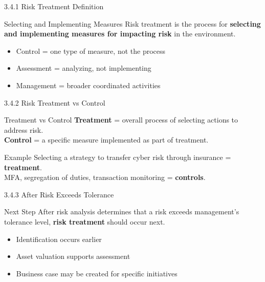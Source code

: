 \documentclass{beamer}
\begin{document}
	\begin{frame}{3.4.1 Risk Treatment Definition}
		\begin{block}{Selecting and Implementing Measures}
			Risk treatment is the process for \textbf{selecting and implementing measures for impacting risk} in the environment.
		\end{block}
		\begin{itemize}
			\item Control = one type of measure, not the process
			\item Assessment = analyzing, not implementing
			\item Management = broader coordinated activities
		\end{itemize}
	\end{frame}
	
	\begin{frame}{3.4.2 Risk Treatment vs Control}
		\begin{block}{Treatment vs Control}
			\textbf{Treatment} = overall process of selecting actions to address risk. \\
			\textbf{Control} = a specific measure implemented as part of treatment.
		\end{block}
		\begin{exampleblock}{Example}
			Selecting a strategy to transfer cyber risk through insurance = \textbf{treatment}. \\
			MFA, segregation of duties, transaction monitoring = \textbf{controls}.
		\end{exampleblock}
	\end{frame}
	
	\begin{frame}{3.4.3 After Risk Exceeds Tolerance}
		\begin{block}{Next Step}
			After risk analysis determines that a risk exceeds management's tolerance level, \textbf{risk treatment} should occur next.
		\end{block}
		\begin{itemize}
			\item Identification occurs earlier
			\item Asset valuation supports assessment
			\item Business case may be created for specific initiatives
		\end{itemize}
	\end{frame}
	
\end{document}
